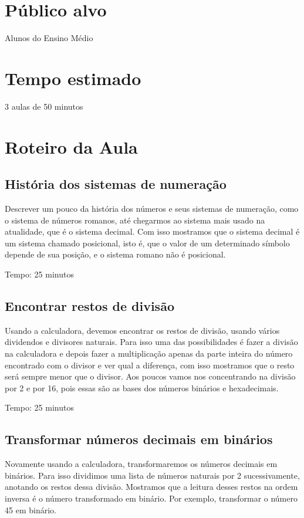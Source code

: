 \documentclass[12pt, openright, a4paper, brazil, openany, oneside]{abntex2}
\begin{document}
\vspace{1cm}

\chapter{Público alvo}

Alunos do Ensino Médio

\vspace{1cm}

\chapter{Tempo estimado}

3 aulas de 50 minutos
\vspace{1cm}



\chapter{Roteiro da Aula}
\section{História dos sistemas de numeração}

Descrever um pouco da história dos números e seus sistemas de numeração, como o sistema de números romanos, até chegarmos ao sistema mais usado na atualidade, que é o sistema decimal. Com isso mostramos que o sistema decimal é um sistema chamado posicional, isto é, que o valor de um determinado símbolo depende de sua posição, e o sistema romano não é posicional.

Tempo: 25 minutos
\section{Encontrar restos de divisão}

Usando a calculadora, devemos encontrar os restos de divisão, usando vários dividendos e divisores naturais. Para isso uma das possibilidades é fazer a divisão na calculadora e depois fazer a multiplicação apenas da parte inteira do número encontrado com o divisor e ver qual a diferença, com isso mostramos que o resto será sempre menor que o divisor. Aos poucos vamos nos concentrando na divisão por 2 e por 16, pois essas são as bases dos números binários e hexadecimais.

Tempo: 25 minutos

\section{Transformar números decimais em binários}
Novamente usando a calculadora, transformaremos os números decimais em binários. Para isso dividimos uma lista de números naturais por 2 sucessivamente, anotando os restos dessa divisão. Mostramos que a leitura desses restos na ordem inversa é o número transformado em binário. Por exemplo, transformar o número 45 em binário.
\end{document}
